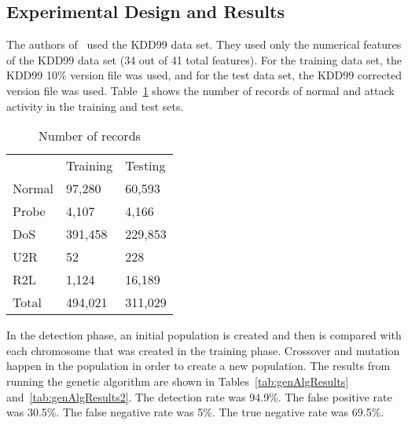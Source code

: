 \documentclass{sig-alternate}
\begin{document}
\subsection{Experimental Design and Results}
The authors of~\cite{DBLP:journals/corr/abs-1204-1336} used the KDD99 data set. They used only the numerical features of the KDD99 data set (34 out of 41 total features). For the training data set, the KDD99 10\% version file was used, and for the test data set, the KDD99 corrected version file was used. Table~\ref{tab:numberOfRecords} shows the number of records of normal and attack activity in the training and test sets.

\begin{table}
\center
\caption{Number of records}
\begin{tabular}{lll}
  & Training & Testing \\ 
Normal & 97,280 & 60,593\\
Probe  & 4,107  & 4,166\\
DoS	   & 391,458 & 229,853\\
U2R    & 52      & 228\\
R2L    & 1,124   & 16,189\\
Total  & 494,021 & 311,029\\
\end{tabular}
\center
\label{tab:numberOfRecords}
\end{table}

In the detection phase, an initial population is created and then is compared with each chromosome that was created in the training phase. Crossover and mutation happen in the population in order to create a new population. The results from running the genetic algorithm are shown in Tables~\ref{tab:genAlgResults} and~\ref{tab:genAlgResults2}. The detection rate was 94.9\%. The false positive rate was 30.5\%. The false negative rate was 5\%. The true negative rate was 69.5\%.
\end{document}
